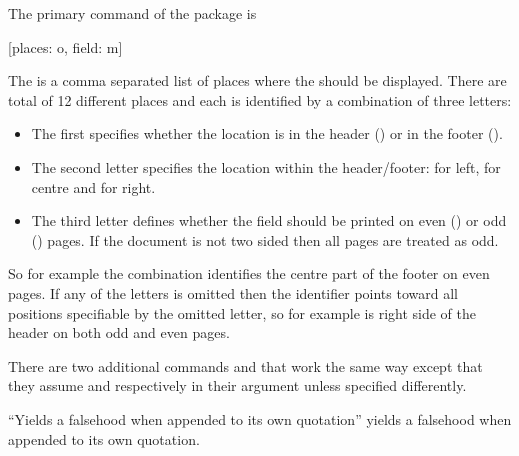 The primary command of the package is
\begin{lscommand}
  [places: o, field: m]
\end{lscommand}
The  is a comma separated list of places where the  should be displayed. There are total of 12 different places and each is identified by a
combination of three letters:
\begin{itemize}
  \item The first specifies whether the location is in the header () or in the
        footer ().
  \item The second letter specifies the location within the header\slash{}footer:  for left,  for centre and
         for right.
  \item The third letter defines whether the field should be printed on even
        () or odd () pages. If the document is not two sided then
        all pages are treated as odd.
\end{itemize}
So for example the combination  identifies the centre part of the
footer on even pages. If any of the letters is omitted then the identifier
points toward all positions specifiable by the omitted letter, so for example
 is right side of the header on both odd and even pages.

There are two additional commands  and  that work
the same way except that they assume  and  respectively
in their  argument unless specified differently.
\begin{example}[standalone, paperheight=3.5cm]
\geometry{includefoot, includehead, headsep=.5em, footskip=1em} %
\sloppy %
\usepackage{csquotes} %
\usepackage{fancyhdr}%
\pagestyle{fancy}%


\noindent %
\enquote{Yields a falsehood when
appended to its own quotation}
yields a falsehood when appended
to its own quotation.
\end{example}

